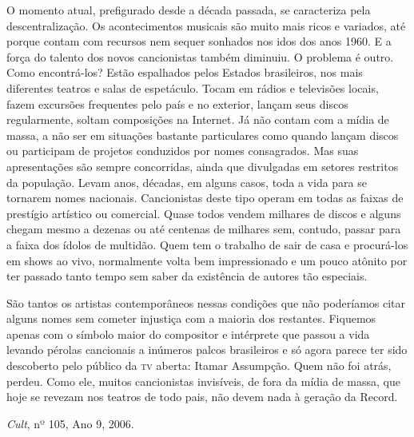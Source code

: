 O momento atual, prefigurado desde a década passada, se caracteriza pela
descentralização. Os acontecimentos musicais são muito mais ricos e
variados, até porque contam com recursos nem sequer sonhados nos idos
dos anos 1960. E a força do talento dos novos cancionistas também
diminuiu. O problema é outro. Como encontrá-los? Estão espalhados pelos
Estados brasileiros, nos mais diferentes teatros e salas de espetáculo.
Tocam em rádios e televisões locais, fazem excursões frequentes pelo
país e no exterior, lançam seus discos regularmente, soltam composições
na Internet. Já não contam com a mídia de massa, a não ser em situações
bastante particulares como quando lançam discos ou participam de
projetos conduzidos por nomes consagrados. Mas suas apresentações são
sempre concorridas, ainda que divulgadas em setores restritos da
população. Levam anos, décadas, em alguns casos, toda a vida para se
tornarem nomes nacionais. Cancionistas deste tipo operam em todas as
faixas de prestígio artístico ou comercial. Quase todos vendem milhares
de discos e alguns chegam mesmo a dezenas ou até centenas de milhares
sem, contudo, passar para a faixa dos ídolos de multidão. Quem tem o
trabalho de sair de casa e procurá-los em shows ao vivo, normalmente
volta bem impressionado e um pouco atônito por ter passado tanto tempo
sem saber da existência de autores tão especiais.

São tantos os artistas contemporâneos nessas condições que não
poderíamos citar alguns nomes sem cometer injustiça com a maioria dos
restantes. Fiquemos apenas com o símbolo maior do compositor e
intérprete que passou a vida levando pérolas cancionais a inúmeros
palcos brasileiros e só agora parece ter sido descoberto pelo público da
\textsc{tv} aberta: Itamar Assumpção. Quem não foi atrás, perdeu. Como ele,
muitos cancionistas invisíveis, de fora da mídia de massa, que hoje se
revezam nos teatros de todo pais, não devem nada à geração da Record.

\textit{Cult}, nº 105, Ano 9, 2006.

